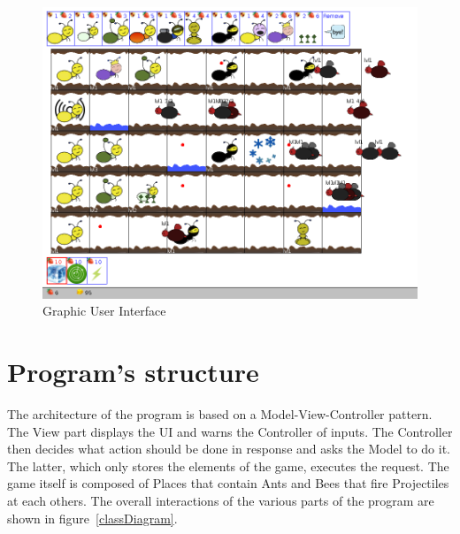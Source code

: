 \documentclass[
	a4paper
]{article}
\begin{document}
%
\begin{figure}[H]
	\includegraphics[scale=0.3]{screen2.png}
	\caption{Graphic User Interface}
	\label{gui}
\end{figure}
%

\newpage

\section{Program's structure}

The architecture of the program is based on a Model-View-Controller pattern. %
The View part displays the UI and warns the Controller of inputs. The Controller then decides what action should be done in response and asks the Model to do it. %
The latter, which only stores the elements of the game, executes the request. %
The game itself is composed of Places that contain Ants and Bees that fire Projectiles at each others. %
The overall interactions of the various parts of the program are shown in figure~\ref{classDiagram}.
\end{document}
